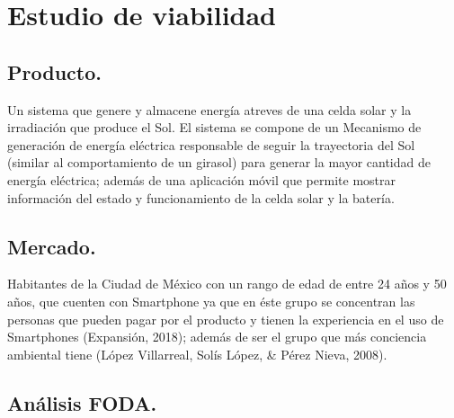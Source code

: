 \chapter{Estudio de viabilidad} %


\section{Producto. }

Un sistema que genere y almacene energía atreves de una celda solar y la irradiación que produce el Sol. El sistema se compone de un Mecanismo de generación de energía eléctrica responsable de seguir la trayectoria del Sol (similar al comportamiento de un girasol) para generar la mayor cantidad de energía eléctrica; además de una aplicación móvil que permite mostrar información del estado y funcionamiento de la celda solar y la batería.

\section{Mercado. }

Habitantes de la Ciudad de México con un rango de edad de entre 24 años y 50 años, que cuenten con Smartphone ya que en éste grupo se concentran las personas que pueden pagar por el producto y tienen la experiencia en el uso de Smartphones (Expansión, 2018); además de ser el grupo que más conciencia ambiental tiene (López Villarreal, Solís López, & Pérez Nieva, 2008).






\section{Análisis FODA.}

